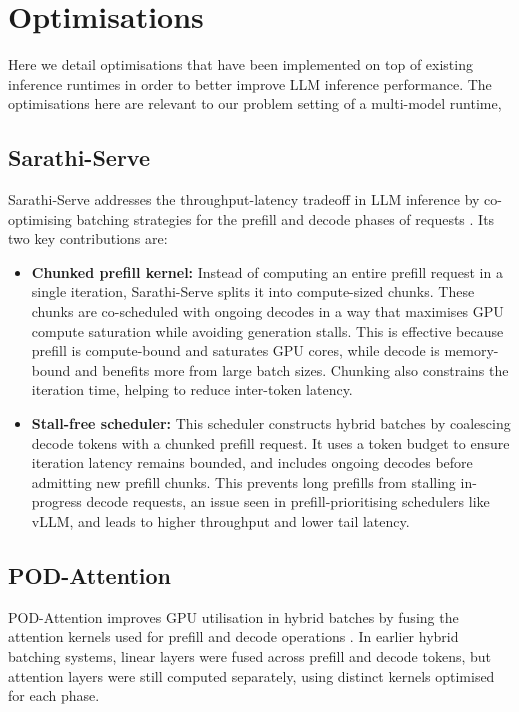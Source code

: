 \documentclass[12pt,twoside]{report}
\begin{document}
\section{Optimisations}\label{section:optimisations}
Here we detail optimisations that have been implemented on top of existing inference runtimes in order to better improve LLM inference performance.
The optimisations here are relevant to our problem setting of a multi-model runtime,  

\subsection{Sarathi-Serve}
Sarathi-Serve addresses the throughput-latency tradeoff in LLM inference by co-optimising batching strategies for the prefill and decode phases of requests \cite{agrawal2024taming}. 
Its two key contributions are:

\begin{itemize}
  \item \textbf{Chunked prefill kernel:} Instead of computing an entire prefill request in a single iteration, Sarathi-Serve splits it into compute-sized chunks. 
    These chunks are co-scheduled with ongoing decodes in a way that maximises GPU compute saturation while avoiding generation stalls. 
    This is effective because prefill is compute-bound and saturates GPU cores, while decode is memory-bound and benefits more from large batch sizes. 
    Chunking also constrains the iteration time, helping to reduce inter-token latency.

  \item \textbf{Stall-free scheduler:} This scheduler constructs hybrid batches by coalescing decode tokens with a chunked prefill request. 
    It uses a token budget to ensure iteration latency remains bounded, and includes ongoing decodes before admitting new prefill chunks. 
    This prevents long prefills from stalling in-progress decode requests, an issue seen in prefill-prioritising schedulers like vLLM, and leads to higher throughput and lower tail latency.
\end{itemize}

\subsection{POD-Attention}
POD-Attention improves GPU utilisation in hybrid batches by fusing the attention kernels used for prefill and decode operations \cite{kamath2025pod}. 
In earlier hybrid batching systems, linear layers were fused across prefill and decode tokens, but attention layers were still computed separately, using distinct kernels optimised for each phase.
\end{document}
